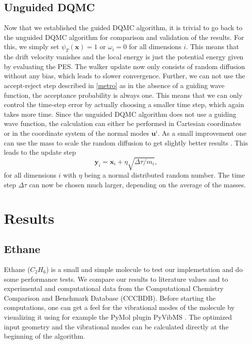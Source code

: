 \documentclass [12pt]{report}
\begin{document}
\section{Unguided DQMC} \label{uDQMC}
Now that we established the guided DQMC algorithm, it is trivial to go back to the unguided DQMC algorithm for comparison and validation of the results. For this, we simply set $\psi_T(\bm{x}) = 1$ or $\omega_i = 0$ for all dimensions $i$. This means that the drift velocity vanishes and the local energy is just the potential energy given by evaluating the PES. The walker update now only consists of random diffusion without any bias, which leads to slower convergence. Further, we can not use the accept-reject step described in \ref{metro} as in the absence of a guiding wave function, the acceptance probability is always one. This means that we can only control the time-step error by actually choosing a smaller time step, which again takes more time. Since the unguided DQMC algorithm does not use a guiding wave function, the calculation can either be performed in Cartesian coordinates or in the coordinate system of the normal modes $\bm{u}^i$. As a small improvement one can use the mass to scale the random diffusion to get slightly better results \cite{mccoy}. This leads to the update step
\begin{equation}
\bm{y}_i = \bm{x}_i + \eta\sqrt{\Delta \tau/m_i},
\end{equation}
for all dimensions $i$ with $\eta$ being a normal distributed random number. The time step $\Delta \tau$ can now be chosen much larger, depending on the average of the masses.

\chapter{Results}

\section{Ethane}

Ethane ($C_2H_6$) is a small and simple molecule to test our implemetation and do some performance tests. We compare our results to literature values\cite{c2h6} and to experimental and computational data from the Computational Chemistry Comparison and Benchmark Database (CCCBDB)\cite{cccbdb}. Before starting the computations, one can get a feel for the vibrational modes of the molecule by visualizing it using for example the PyMol plugin PyVibMS \cite{PyVibMS}. The optimized input geometry and the vibrational modes can be calculated directly at the beginning of the algorithm. 
\end{document}
